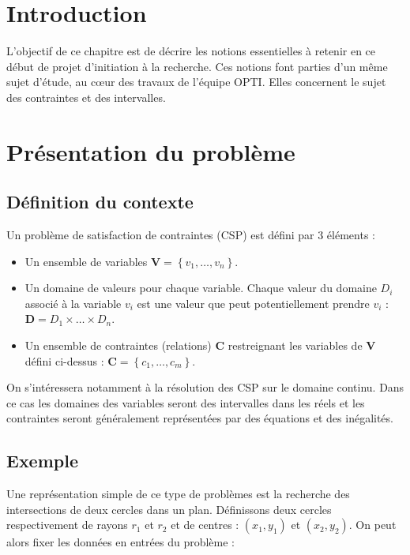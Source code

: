 \section{Introduction }
L'objectif de ce chapitre est de décrire les notions essentielles à retenir en ce début de projet d'initiation à la recherche. Ces notions font parties d'un même sujet d'étude, au cœur des travaux de l'équipe \textsc{OPTI}. Elles concernent le sujet des contraintes et des intervalles. %

\section{Présentation du problème}
\subsection{Définition du contexte}
Un problème de satisfaction de contraintes (\textsc{CSP}) est défini par 3 éléments : 
\begin{itemize}
\item
Un ensemble de variables $\mathbf{V} = \left\{ v_1, \dots ,v_n \right\}$.
\item
Un domaine de valeurs pour chaque variable. Chaque valeur du domaine $D_i$ associé à la variable $v_i$ est une valeur que peut potentiellement prendre $v_i$ : $\mathbf{D} = D_1 \times \dots \times D_n $.
\item
Un ensemble de contraintes (relations) $\mathbf{C}$ restreignant les variables de $\mathbf{V}$ défini ci-dessus :  $\mathbf{C} = \left\{c_1, \dots ,c_m\right\}$. 
\end{itemize}

On s'intéressera notamment à la résolution des \textsc{CSP} sur le domaine continu. Dans ce cas les domaines des variables seront des intervalles dans les réels et les contraintes seront généralement représentées par des équations et des inégalités. 

\subsection{Exemple}

Une représentation simple de ce type de problèmes est la recherche des intersections de deux cercles dans un plan. Définissons deux cercles respectivement de rayons  $r_1$ et $r_2$ et de centres : $(x_1,y_1)$ et $(x_2,y_2)$.
On peut alors fixer les données en entrées du problème :

